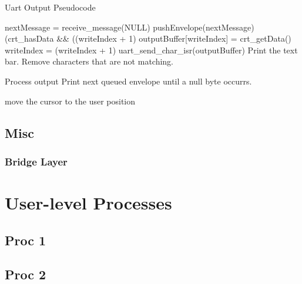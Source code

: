 \documentclass[12pt]{report}
\begin{document}
    \begin{algorithm}
        \caption{Uart Output Pseudocode}
        \label{code:uart_output}
        \begin{algorithmic}[1]
                \Loop
                    \State nextMessage = receive\_message(NULL)
                    \State pushEnvelope(nextMessage)
                    \While(crt\_hasData \&\& ((writeIndex + 1) %
                        \State outputBuffer[writeIndex] = crt\_getData()
                        \State writeIndex = (writeIndex + 1) %
                    \EndWhile
                    \State uart\_send\_char\_isr(outputBuffer)
                \EndLoop
            \EndFunction
                \State Print the text bar. Remove characters that are not matching.

                \State Process output
                    \State Print next queued envelope until a null byte occurrs.
                \EndWhile

                \State move the cursor to the user position
            \EndFunction
        \end{algorithmic}
    \end{algorithm}



\chapter{Misc}

\section{Bridge Layer}

\part{User-level Processes}

\chapter{Proc 1}

\chapter{Proc 2}
\end{document}

